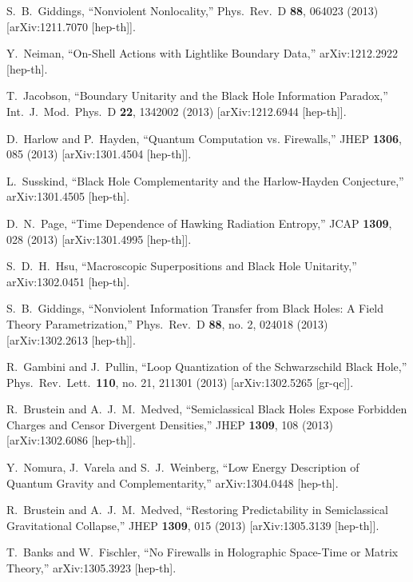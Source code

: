 \documentclass[12pt]{article}
\begin{document}
\begin{thebibliography}{99}
  S.~B.~Giddings,
  ``Nonviolent Nonlocality,''
  Phys.\ Rev.\ D {\bf 88}, 064023 (2013)
  [arXiv:1211.7070 [hep-th]].

  Y.~Neiman,
  ``On-Shell Actions with Lightlike Boundary Data,''
  arXiv:1212.2922 [hep-th].

  T.~Jacobson,
  ``Boundary Unitarity and the Black Hole Information Paradox,''
  Int.\ J.\ Mod.\ Phys.\ D {\bf 22}, 1342002 (2013)
  [arXiv:1212.6944 [hep-th]].  

  D.~Harlow and P.~Hayden,
  ``Quantum Computation vs. Firewalls,''
  JHEP {\bf 1306}, 085 (2013)
  [arXiv:1301.4504 [hep-th]].

  L.~Susskind,
  ``Black Hole Complementarity and the Harlow-Hayden Conjecture,''
  arXiv:1301.4505 [hep-th].

  D.~N.~Page,
  ``Time Dependence of Hawking Radiation Entropy,''
  JCAP {\bf 1309}, 028 (2013)
  [arXiv:1301.4995 [hep-th]].

  S.~D.~H.~Hsu,
  ``Macroscopic Superpositions and Black Hole Unitarity,''
  arXiv:1302.0451 [hep-th].

  S.~B.~Giddings,
  ``Nonviolent Information Transfer from Black Holes: A Field Theory Parametrization,''
  Phys.\ Rev.\ D {\bf 88}, no. 2, 024018 (2013)
  [arXiv:1302.2613 [hep-th]].

  R.~Gambini and J.~Pullin,
  ``Loop Quantization of the Schwarzschild Black Hole,''
  Phys.\ Rev.\ Lett.\  {\bf 110}, no. 21, 211301 (2013)
  [arXiv:1302.5265 [gr-qc]].

  R.~Brustein and A.~J.~M.~Medved,
  ``Semiclassical Black Holes Expose Forbidden Charges and Censor Divergent Densities,''
  JHEP {\bf 1309}, 108 (2013)
  [arXiv:1302.6086 [hep-th]].

  Y.~Nomura, J.~Varela and S.~J.~Weinberg,
  ``Low Energy Description of Quantum Gravity and Complementarity,''
  arXiv:1304.0448 [hep-th].

  R.~Brustein and A.~J.~M.~Medved,
  ``Restoring Predictability in Semiclassical Gravitational Collapse,''
  JHEP {\bf 1309}, 015 (2013)
  [arXiv:1305.3139 [hep-th]].

  T.~Banks and W.~Fischler,
  ``No Firewalls in Holographic Space-Time or Matrix Theory,''
  arXiv:1305.3923 [hep-th].


\end{thebibliography}
\end{document}
